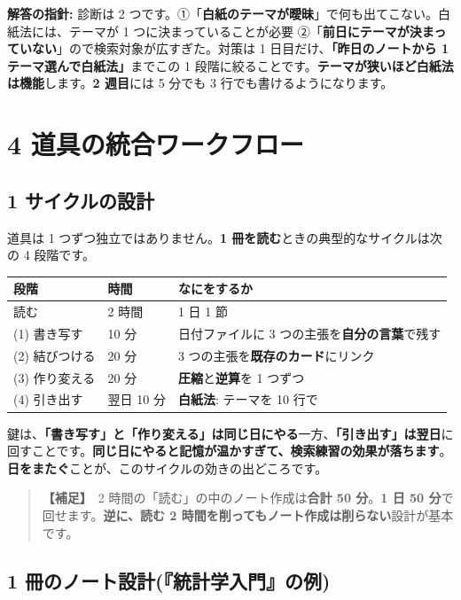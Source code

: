 \documentclass{article}
\begin{document}
\textbf{解答の指針:} 診断は 2 つです。①「\textbf{白紙のテーマが曖昧}」で何も出てこない。白紙法には、テーマが 1 つに決まっていることが必要 ②「\textbf{前日にテーマが決まっていない}」ので検索対象が広すぎた。対策は 1 日目だけ、\textbf{「昨日のノートから 1 テーマ選んで白紙法」}までこの 1 段階に絞ることです。\textbf{テーマが狭いほど白紙法は機能}します。\textbf{2 週目}には 5 分でも 3 行でも書けるようになります。

\section{4 道具の統合ワークフロー}

\subsection{1 サイクルの設計}

道具は 1 つずつ独立ではありません。\textbf{1 冊を読む}ときの典型的なサイクルは次の 4 段階です。

\begin{center}
\begin{tabular}{|l|l|l|}
\hline
段階 & 時間 & なにをするか \\
\hline
読む & 2 時間 & 1 日 1 節 \\
\hline
(1) 書き写す & 10 分 & 日付ファイルに 3 つの主張を\textbf{自分の言葉}で残す \\
\hline
(2) 結びつける & 20 分 & 3 つの主張を\textbf{既存のカード}にリンク \\
\hline
(3) 作り変える & 20 分 & \textbf{圧縮}と\textbf{逆算}を 1 つずつ \\
\hline
(4) 引き出す & 翌日 10 分 & \textbf{白紙法}: テーマを 10 行で \\
\hline
\end{tabular}
\end{center}

鍵は、\textbf{「書き写す」と「作り変える」は同じ日にやる}一方、\textbf{「引き出す」は翌日}に回すことです。\textbf{同じ日にやると記憶が温かすぎて、検索練習の効果が落ちます}。\textbf{日をまたぐ}ことが、このサイクルの効きの出どころです。

\begin{quote}
\textbf{【補足】}\ 2 時間の「読む」の中のノート作成は\textbf{合計 50 分}。\textbf{1 日 50 分}で回せます。\textbf{逆に、読む 2 時間を削ってもノート作成は削らない}設計が基本です。
\end{quote}

\subsection{1 冊のノート設計(『統計学入門』の例)}
\end{document}
